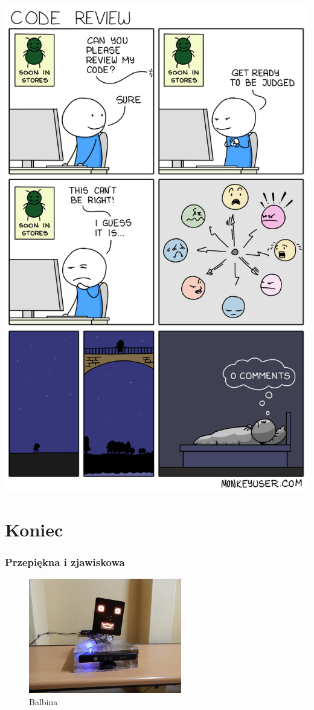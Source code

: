 \documentclass[xcolor=dvipsnames]{beamer}%
\begin{document}
\begin{frame}
	\includegraphics[width=\textwidth,height=\textheight,keepaspectratio]{figure/no_comments.png}
\end{frame}

\section{Koniec}
\begin{frame}
	\frametitle{Przepiękna i zjawiskowa}
	\centering \begin{figure}
		\includegraphics[height=5cm]{figure/balbina.jpg}
		\caption{Balbina}
	\end{figure}
\end{frame}
\end{document}
